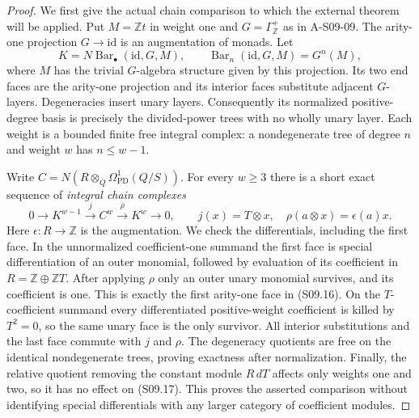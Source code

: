 \begin{proof}
We first give the actual chain comparison to which the external
theorem will be applied.  Put $M=\mathbb Zt$ in weight one and
$G=\Gamma^+_{\mathbb Z}$ as in A-S09-09.  The arity-one
projection $G\to\mathrm{id}$ is an augmentation of monads.
Let
\[
 K=N\operatorname{Bar}_\bullet(\mathrm{id},G,M),
 \qquad \operatorname{Bar}_n(\mathrm{id},G,M)=G^n(M),
 \tag{S09.16}
\]
where $M$ has the trivial $G$-algebra structure given by this
projection.  Its two end faces are the arity-one projection
and its interior faces substitute adjacent $G$-layers.
Degeneracies insert unary layers.  Consequently its normalized
positive-degree basis is precisely the divided-power trees
with no wholly unary layer.  Each weight is a bounded finite
free integral complex: a nondegenerate tree of degree $n$
and weight $w$ has $n\leq w-1$.

Write $C=N(R\otimes_Q\Omega^1_{\mathrm{PD}}(Q/S))$.
For every $w\geq3$ there is a short exact sequence of
\emph{integral chain complexes}
\[
 0\longrightarrow K^{w-1}
   \xrightarrow{\ j\ } C^w
   \xrightarrow{\ \rho\ }K^w\longrightarrow0,
 \qquad
 j(x)=T\otimes x,\quad
 \rho(a\otimes x)=\epsilon(a)x.
 \tag{S09.17}
\]
Here $\epsilon:R\to\mathbb Z$ is the augmentation.  We check
the differentials, including the first face.  In the unnormalized
coefficient-one summand the first face is special differentiation
of an outer monomial, followed by evaluation of its coefficient
in $R=\mathbb Z\oplus\mathbb ZT$.  After applying $\rho$ only
an outer unary monomial survives, and its coefficient is one.
This is exactly the first arity-one face in (S09.16).  On the
$T$-coefficient summand every differentiated positive-weight
coefficient is killed by $T^2=0$, so the same unary face is
the only survivor.  All interior substitutions and the last
face commute with $j$ and $\rho$.  The degeneracy quotients
are free on the identical nondegenerate trees, proving exactness
after normalization.  Finally, the relative quotient removing
the constant module $R\,dT$ affects only weights one and two,
so it has no effect on (S09.17).  This proves the asserted
comparison without identifying special differentials with
any larger category of coefficient modules.


\end{proof}
